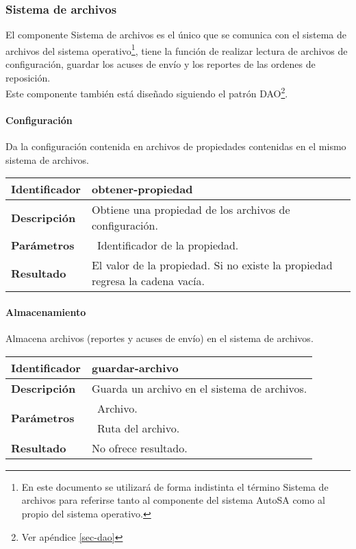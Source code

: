 \subsubsection{Sistema de archivos}
El componente Sistema de archivos es el único que se comunica con el sistema de archivos del sistema operativo\footnote{En este documento se utilizará de forma indistinta el término Sistema de archivos para referirse tanto al componente del sistema AutoSA como al propio del sistema operativo.}, tiene la función de realizar lectura de archivos de configuración, guardar los acuses de envío  y los reportes de las ordenes de reposición.\\
Este componente también está diseñado siguiendo el patrón DAO\footnote{Ver apéndice \ref{sec-dao}}.
\paragraph{Configuración\\}
Da la configuración contenida en archivos de propiedades contenidas en el mismo sistema de archivos.
	\vspace{5mm}\\
	\begin{tabular}{|p{}|p{}|}
		\hline
		\textbf{Identificador}	& \textbf{obtener-propiedad}\\
		\hline
		\hline
		\textbf{Descripción}	& Obtiene una propiedad de los archivos de configuración.\\
		\hline
		\textbf{Parámetros}		& \textbullet\, Identificador de la propiedad.\\
		\hline
		\textbf{Resultado}		& El valor de la propiedad. Si no existe la propiedad regresa la cadena vacía.\\
		\hline
	\end{tabular}
	\vspace{5mm}
\paragraph{Almacenamiento\\}
Almacena archivos (reportes y acuses de envío) en el sistema de archivos.
	\vspace{5mm}\\
	\begin{tabular}{|p{}|p{}|}
		\hline
		\textbf{Identificador}	& \textbf{guardar-archivo}\\
		\hline
		\hline
		\textbf{Descripción}	& Guarda un archivo en el sistema de archivos.\\
		\hline
		\multirow{2}{*}{\textbf{Parámetros}}	& \textbullet\, Archivo.\\
												& \textbullet\, Ruta del archivo.\\
		\hline
		\textbf{Resultado}		& No ofrece resultado.\\
		\hline
	\end{tabular}
	\vspace{5mm}

